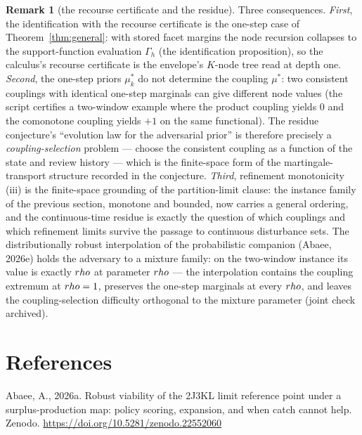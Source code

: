 \documentclass[10pt,twocolumn]{article}
\theoremstyle{definition}
\newtheorem{remark}{Remark}
\begin{document}
\begin{remark}[the recourse certificate and the residue]\label{rem:after-general}
Three consequences. \emph{First}, the identification with the recourse
certificate is the one-step case of Theorem~\ref{thm:general}: with
stored facet margins the node recursion collapses to the
support-function evaluation $\Gamma_{h}$ (the identification
proposition), so the calculus's recourse
certificate is the envelope's $K$-node tree read at depth one.
\emph{Second}, the one-step priors $\mu^{*}_{k}$ do not determine the
coupling $\mu^{*}$: two consistent couplings with identical one-step
marginals can give different node values (the script certifies a
two-window example where the product coupling yields $0$ and the
comonotone coupling yields $+1$ on the same functional). The residue
conjecture's ``evolution law for the adversarial prior'' is therefore
precisely a \emph{coupling-selection} problem --- choose the consistent
coupling as a function of the state and review history --- which is the finite-space form of the martingale-transport structure recorded in the conjecture. \emph{Third}, refinement monotonicity (iii) is the
finite-space grounding of the partition-limit clause: the instance
family of the previous section, monotone and bounded, now carries a
general ordering, and the continuous-time residue is exactly the
question of which couplings and which refinement limits survive the
passage to continuous disturbance sets. The distributionally robust
interpolation of the probabilistic companion (Abaee, 2026e) holds the
adversary to a mixture family: on the two-window instance its value is
exactly $\\rho$ at parameter $\\rho$ --- the interpolation contains the
coupling extremum at $\\rho = 1$, preserves the one-step marginals at
every $\\rho$, and leaves the coupling-selection difficulty orthogonal to
the mixture parameter (joint check archived).
\end{remark}

\section{References}

Abaee, A., 2026a. Robust viability of the 2J3KL limit reference point
under a surplus-production map: policy scoring, expansion, and when catch
cannot help. Zenodo. \url{https://doi.org/10.5281/zenodo.22552060}
\end{document}

